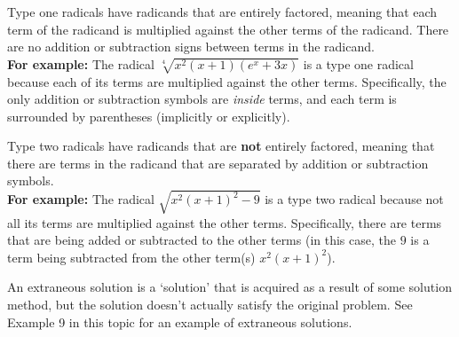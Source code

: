 \documentclass{ximeraXloud}
\begin{document}
\begin{definition}
    Type one radicals have radicands that are entirely factored, meaning that each term of the radicand is multiplied against the other terms of the radicand. There are no addition or subtraction signs between terms in the radicand.\\
    \textbf{For example:} The radical $\sqrt[4]{x^2(x+1)(e^x + 3x)}$ is a type one radical because each of its terms are multiplied against the other terms. Specifically, the only addition or subtraction symbols are \textit{inside} terms, and each term is surrounded by parentheses (implicitly or explicitly).
\end{definition} 

\begin{definition}
    Type two radicals have radicands that are \textbf{not} entirely factored, meaning that there are terms in the radicand that are separated by addition or subtraction symbols.\\
    \textbf{For example:} The radical $\sqrt{x^2(x+1)^2 - 9}$ is a type two radical because not all its terms are multiplied against the other terms. Specifically, there are terms that are being added or subtracted to the other terms (in this case, the $9$ is a term being subtracted from the other term(s) $x^2(x+1)^2$).
\end{definition} 

\begin{definition}
    An extraneous solution is a `solution' that is acquired as a result of some solution method, but the solution doesn't actually satisfy the original problem. See Example 9 in this topic for an example of extraneous solutions.
\end{definition}
\end{document}

